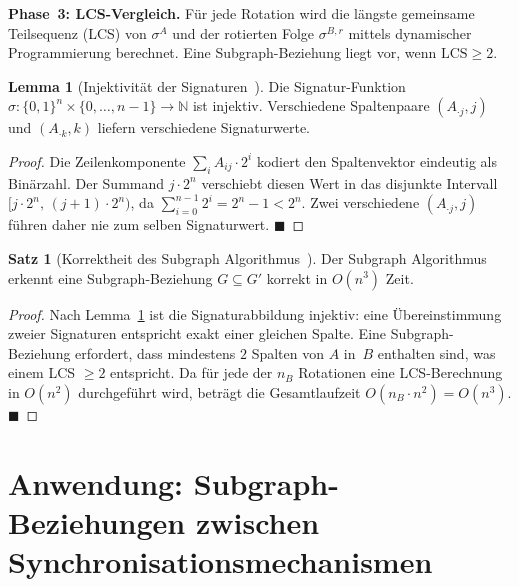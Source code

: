 ﻿\documentclass[a4paper,12pt]{article}
\theoremstyle{definition}
\newtheorem{satz}{Satz}
\newtheorem{lemma}{Lemma}
\begin{document}
\textbf{Phase~3: LCS-Vergleich.}
Für jede Rotation wird die längste gemeinsame Teilsequenz (LCS) von
$\sigma^A$ und der rotierten Folge $\sigma^{B,r}$ mittels dynamischer
Programmierung berechnet. Eine Subgraph-Beziehung liegt vor, wenn
$\mathrm{LCS} \geq 2$.

\begin{lemma}[Injektivität der Signaturen~\cite{epp2026subgraph}]
  \label{lem:inj}
  Die Signatur-Funktion $\sigma: \{0,1\}^n \times \{0,\ldots,n-1\} \to \mathbb{N}$
  ist injektiv. Verschiedene Spaltenpaare $(A_{\cdot j}, j)$ und
  $(A_{\cdot k}, k)$ liefern verschiedene Signaturwerte.
\end{lemma}

\begin{proof}
  Die Zeilenkomponente $\sum_{i} A_{ij} \cdot 2^i$ kodiert den Spaltenvektor
  eindeutig als Binärzahl. Der Summand $j \cdot 2^n$ verschiebt diesen Wert
  in das disjunkte Intervall $[j \cdot 2^n,\, (j+1) \cdot 2^n)$, da
  $\sum_{i=0}^{n-1} 2^i = 2^n - 1 < 2^n$. Zwei verschiedene
  $(A_{\cdot j}, j)$ führen daher nie zum selben Signaturwert.
  \hfill$\blacksquare$
\end{proof}

\begin{satz}[Korrektheit des Subgraph Algorithmus~\cite{epp2026subgraph}]
  \label{satz:korrektheit}
  Der Subgraph Algorithmus erkennt eine Subgraph-Beziehung $G \subseteq G'$
  korrekt in $O(n^3)$ Zeit.
\end{satz}

\begin{proof}
  Nach Lemma~\ref{lem:inj} ist die Signaturabbildung injektiv: eine
  Übereinstimmung zweier Signaturen entspricht exakt einer gleichen Spalte.
  Eine Subgraph-Beziehung erfordert, dass mindestens $2$ Spalten von $A$
  in~$B$ enthalten sind, was einem LCS $\geq 2$ entspricht. Da für jede der
  $n_B$ Rotationen eine LCS-Berechnung in $O(n^2)$ durchgeführt wird,
  beträgt die Gesamtlaufzeit $O(n_B \cdot n^2) = O(n^3)$.
  \hfill$\blacksquare$
\end{proof}

\section{Anwendung: Subgraph-Beziehungen zwischen Synchronisationsmechanismen}
\label{sec:anwendung}
\end{document}
